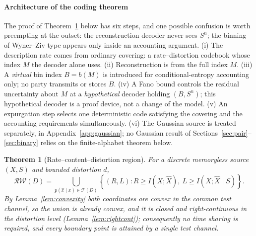 ﻿\documentclass[11pt,onecolumn]{IEEEtran}
\newtheorem{theorem}{Theorem}
\newcommand{\hX}{\widehat{X}}
\newcommand{\RW}{\mathcal{R}\!\mathcal{W}}
\begin{document}
\paragraph*{Architecture of the coding theorem}
The proof of Theorem~\ref{thm:main-region} below has six steps, and one
possible confusion is worth preempting at the outset: the reconstruction
decoder never sees $S^n$; the binning of Wyner--Ziv type appears only
inside an accounting argument. (i) The description rate comes from
ordinary covering: a rate--distortion codebook whose index $M$ the
decoder alone uses. (ii) Reconstruction is from the full index $M$.
(iii) A \emph{virtual} bin index $B=b(M)$ is introduced for
conditional-entropy accounting only; no party transmits or stores $B$.
(iv) A Fano bound controls the residual uncertainty about $M$ at a
\emph{hypothetical} decoder holding $(B,S^n)$; this hypothetical decoder
is a proof device, not a change of the model. (v) An expurgation step
selects one deterministic code satisfying the covering and the
accounting requirements simultaneously. (vi) The Gaussian source is
treated separately, in Appendix~\ref{app:gaussian}; no Gaussian result
of Sections~\ref{sec:pair}--\ref{sec:binary} relies on the
finite-alphabet theorem below.

\begin{theorem}[Rate--content--distortion region]\label{thm:main-region}
For a discrete memoryless source $(X,S)$ and bounded distortion $d$,
\begin{equation}
\boxed{
 \RW(D)
 =\bigcup_{p(\hat x\mid x)\in\mathcal T(D)}
 \left\{(R,L):
 R\ge I(X;\hX),\
 L\ge I(X;\hX\mid S)
 \right\}.}
 \label{eq:main-region}
\end{equation}
By Lemma~\ref{lem:convexity} both coordinates are convex in the common
test channel, so the union is already convex, and it is closed and
right-continuous in the distortion level (Lemma~\ref{lem:rightcont});
consequently no time sharing is required, and every boundary point is
attained by a single test channel.
\end{theorem}
\end{document}
